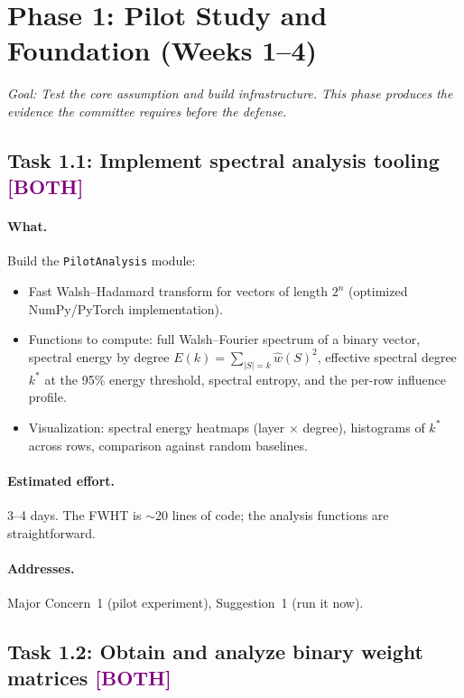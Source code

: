\documentclass[12pt,a4paper]{article}
\newcommand{\both}{\texorpdfstring{\textcolor{purple}{\textbf{[BOTH]}}}{[BOTH]}}
\begin{document}
\section{Phase 1: Pilot Study and Foundation (Weeks 1--4)}\label{sec:phase1}

\textit{Goal: Test the core assumption and build infrastructure. This phase produces the evidence the committee requires before the defense.}

\subsection{Task 1.1: Implement spectral analysis tooling \both}

\paragraph{What.} Build the \texttt{PilotAnalysis} module:
\begin{itemize}
    \item Fast Walsh--Hadamard transform for vectors of length $2^n$ (optimized NumPy/PyTorch implementation).
    \item Functions to compute: full Walsh--Fourier spectrum of a binary vector, spectral energy by degree $E(k) = \sum_{|S|=k} \hat{w}(S)^2$, effective spectral degree $k^*$ at the 95\% energy threshold, spectral entropy, and the per-row influence profile.
    \item Visualization: spectral energy heatmaps (layer $\times$ degree), histograms of $k^*$ across rows, comparison against random baselines.
\end{itemize}

\paragraph{Estimated effort.} 3--4 days. The FWHT is $\sim$20 lines of code; the analysis functions are straightforward.

\paragraph{Addresses.} Major Concern~1 (pilot experiment), Suggestion~1 (run it now).

\subsection{Task 1.2: Obtain and analyze binary weight matrices \both}
\end{document}
